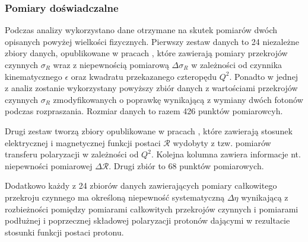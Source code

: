 \documentclass[11pt]{book}
\theoremstyle{definition}
\begin{document}
\subsubsection{Pomiary doświadczalne}
Podczas analizy wykorzystano dane otrzymane na skutek pomiarów dwóch opisanych powyżej wielkości fizycznych. Pierwszy zestaw danych to 24 niezależne zbiory danych, opublikowane w pracach \cite{1966PhRv..142..922J, 1966PhRvL..17..608B, 1967PhRvL..18.1014A, 1970PhLB...31...40L, 1970PhRvD...1.2449G, 1971PhLB...35...87B, 1971PhRvD...4...45P, 1974NuPhA.222..269B, 1973NuPhB..58..429B, 1973PhRvD...8...63K, 1993PhRvD..48...29S, 1994PhRvD..49.5671W, 1994PhRvD..50.5491A, 1975NuPhB..93..461B, 1975PhRvD..12.1884S, 1974PhRvC..10.2111M, 1980NuPhA.333..381S, 1981NuPhA.364..285S, 1992PhRvD..46...24R, 2003PhRvC..68f4603D, 2004PhRvC..70a5206C}, które zawierają pomiary przekrojów czynnych $\sigma_R$ wraz z niepewnością pomiarową $\Delta \sigma_R$ w zależności od czynnika kinematycznego $\epsilon$ oraz kwadratu przekazanego czteropędu $Q^2$. Ponadto w jednej z analiz zostanie wykorzystany powyższy zbiór danych z wartościami przekrojów czynnych $\sigma_R$ zmodyfikowanych o poprawkę wynikającą z wymiany dwóch fotonów podczas rozpraszania.  Rozmiar danych to razem 426 punktów pomiarowcyh. 

Drugi zestaw tworzą zbiory opublikowane w pracach \cite{1999PhRvL..82.2221M, 2000PhRvL..84.1398J, 2001PhLB..500...47D, 2001EPJA...12..125P, 2002PhRvL..88i2301G, 2001PhRvC..64c8202G, 2005PhRvC..71e5202P, 2006PhRvC..73f4004H, 2006NuPhA.764..261M, 2006PhRvC..74c5201J, 2007PhRvL..99t2002R, 2007PhRvL..98e2301C}, które zawierają stosunek elektrycznej i magnetycznej funkcji postaci $\mathcal{R}$ wydobyty z tzw. pomiarów transferu polaryzacji w zależności od $Q^2$. Kolejna kolumna zawiera informacje nt. niepewności pomiarowej $\Delta \mathcal{R}$. Drugi zbiór to 68 punktów pomiarowych.  

Dodatkowo każdy z 24 zbiorów danych zawierających pomiary całkowitego przekroju czynnego ma określoną niepewność systematyczną $\Delta \eta$ wynikającą z rozbieżności pomiędzy pomiarami całkowitych przekrojów czynnych i pomiarami podłużnej i poprzecznej składowej polaryzacji protonów dającymi w rezultacie stosunki funkcji postaci protonu. 
\end{document}
